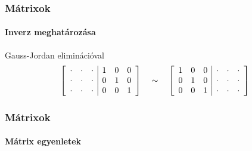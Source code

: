 \begin{frame}
  \frametitle{Mátrixok}
  \framesubtitle{Inverz meghatározása}

  \vfill

  \begin{block}{Gauss-Jordan eliminációval}
    \[
      \left[\begin{array}{*{3}{>{\cdot}{c}}|*{3}c}
           &  &  & 1 & 0 & 0 \\
           &  &  & 0 & 1 & 0 \\
           &  &  & 0 & 0 & 1 \\
        \end{array}\right]
      \quad \sim \quad
      \left[\begin{array}{*{3}{c}|*{3}{>{\cdot}{c}}}
          1 & 0 & 0 &  &  & \\
          0 & 1 & 0 &  &  & \\
          0 & 0 & 1 &  &  & \\
        \end{array}\right]
    \]
  \end{block}

  \vfill

  

  \vfill
\end{frame}

\begin{frame}
  \frametitle{Mátrixok}
  \framesubtitle{Mátrix egyenletek}

  
\end{frame}

